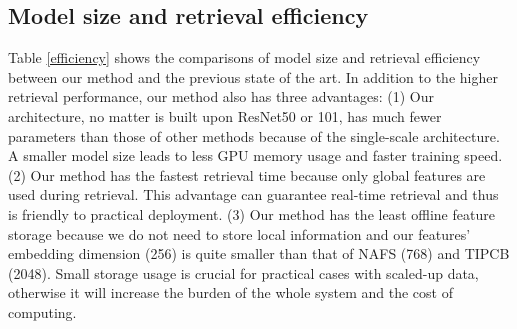 \documentclass{bmvc2k}
\begin{document}
\subsection{Model size and retrieval efficiency}
Table \ref{efficiency} shows the comparisons of model size and retrieval efficiency between our method and the previous state of the art. In addition to the higher retrieval performance, our method also has three advantages: (1) Our architecture, no matter is built upon ResNet50 or 101, has much fewer parameters than those of other methods because of the single-scale architecture. A smaller model size leads to less GPU memory usage and faster training speed. (2) Our method has the fastest retrieval time because only global features are used during retrieval. This advantage can guarantee real-time retrieval and thus is friendly to practical deployment. (3) Our method has the least offline feature storage because we do not need to store local information and our features' embedding dimension (256) is quite smaller than that of NAFS (768) and TIPCB (2048). Small storage usage is crucial for practical cases with scaled-up data, otherwise it will increase the burden of the whole system and the cost of computing.
\end{document}

